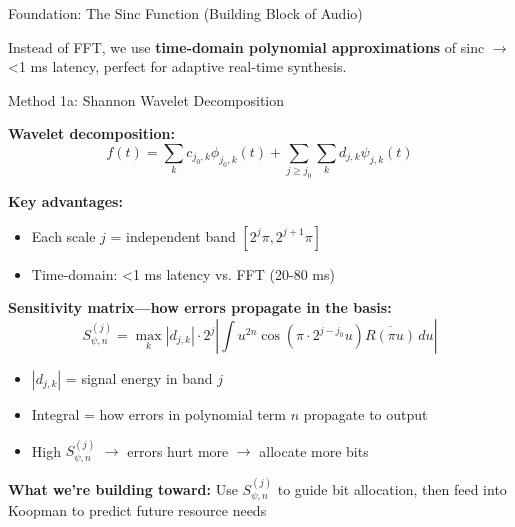 \documentclass[aspectratio=169,11pt]{beamer}
\begin{document}
\begin{frame}{Foundation: The Sinc Function (Building Block of Audio)}
\vspace{0.15cm}

\begin{tcolorbox}[colback=blue!10,colframe=blue!70,title=\textbf{Our Approach}]
Instead of FFT, we use \textbf{time-domain polynomial approximations} of sinc $\rightarrow$ <1 ms latency, perfect for adaptive real-time synthesis.
\end{tcolorbox}

\end{frame}

\begin{frame}{Method 1a: Shannon Wavelet Decomposition}

\textbf{Wavelet decomposition:}
\[
f(t) = \sum_{k} c_{j_0,k} \phi_{j_0,k}(t) + \sum_{j \geq j_0} \sum_{k} d_{j,k} \psi_{j,k}(t)
\]

\vspace{0.1cm}

\textbf{Key advantages:}
\begin{itemize}
    \item Each scale $j$ = independent band $[2^j\pi, 2^{j+1}\pi]$
    \item Time-domain: <1 ms latency vs. FFT (20-80 ms)
\end{itemize}

\vspace{0.1cm}

\textbf{Sensitivity matrix—how errors propagate in the basis:}
\[
S_{\psi,n}^{(j)} = \max_{k} |d_{j,k}| \cdot 2^{j} \left|\int u^{2n} \cos(\pi \cdot 2^{j-j_0} u) \overline{R(\pi u)} \, du\right|
\]
\begin{itemize}
    \item $|d_{j,k}|$ = signal energy in band $j$
    \item Integral = how errors in polynomial term $n$ propagate to output
    \item High $S_{\psi,n}^{(j)}$ $\rightarrow$ errors hurt more $\rightarrow$ allocate more bits
\end{itemize}

\vspace{0.1cm}

\textbf{What we're building toward:} Use $S_{\psi,n}^{(j)}$ to guide bit allocation, then feed into Koopman to predict future resource needs

\end{frame}
\end{document}
